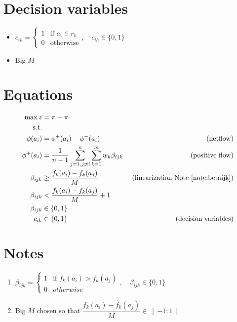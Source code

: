 \documentclass[a4paper]{article}
\begin{document}
    \section{Decision variables}
    \begin{itemize}
        \item $c_{ih} = \begin{cases}
            1 & \text{if } a_i \in r_h \\
            0 & \text{otherwise}
        \end{cases}, \quad c_{ih} \in \{0, 1\}$
        \item Big $M$
    \end{itemize}
    \section{Equations}
    \begin{align*}
        \max z &= \pi_{} - \pi_{}\\
        \text{s.t.} & \\
        \phi(a_i) &= \phi^+(a_i) - \phi^-(a_i) & \text{ (netflow)} \\
        \phi^+(a_i) &= \frac{1}{n-1} \sum_{j=1, j\neq i}^{n} \sum_{k=1}^{m} w_k \beta_{ijk} & \text{ (positive flow)} \\
        \beta_{ijk} &\geq \frac{f_k(a_i)-f_k(a_j)}{M} & \text{ (linearization Note \ref{note:betaijk})} \\
        \beta_{ijk} &< \frac{f_k(a_i)-f_k(a_j)}{M} + 1 \\
        \beta_{ijk} &\in \{0,1\}\\
        c_{ik} &\in \{0, 1\} & \text{ (decision variables)}
    \end{align*}
    \section{Notes}
    \begin{enumerate}
        \item \label{note:betaijk}$\beta_{ijk} = \begin{cases}
            1 & \text{if } f_k(a_i) > f_k(a_j) \\
            0 & otherwise
        \end{cases}, \quad \beta_{ijk} \in \{0, 1\}$
        \item Big $M$ chosen so that $\dfrac{f_k(a_i)-f_k(a_j)}{M} \in \left]-1;1\right[$
    \end{enumerate}
\end{document}
